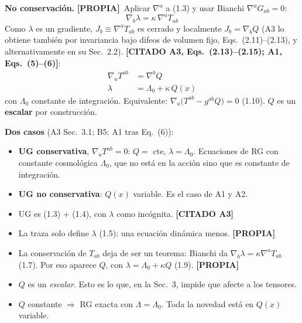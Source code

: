 \documentclass[11pt,a4paper]{article}
\newcommand{\propia}{{\bfseries\color{TealBlue}[PROPIA]}}
\newcommand{\citado}[1]{{\bfseries\color{RoyalBlue}[CITADO #1]}}
\newcommand{\sub}[2]{\par\medskip\noindent{\bfseries\color{NavyBlue}#1}\quad\textbf{#2}}
\begin{document}
\sub{1.5}{No conservación.} \propia\ Aplicar $\nabla^a$ a (1.3) y usar Bianchi $\nabla^aG_{ab}=0$:
\begin{equation}
\nabla_b\lambda=\kappa\,\nabla^aT_{ab}\tag{1.7}
\end{equation}
Como $\lambda$ es un gradiente, $J_b\equiv\nabla^aT_{ab}$ es cerrado y localmente $J_b=\nabla_bQ$ (A3 lo obtiene también por invariancia bajo difeos de volumen fijo, Eqs.~(2.11)--(2.13), y alternativamente en su Sec.~2.2). \citado{A3, Eqs.~(2.13)--(2.15); A1, Eqs.~(5)--(6)}:
\begin{align}
\nabla_aT^{ab}&=\nabla^bQ\tag{1.8}\\
\lambda&=\Lambda_0+\kappa\,Q(x)\tag{1.9}
\end{align}
con $\Lambda_0$ constante de integración. Equivalente: $\nabla_a\big(T^{ab}-g^{ab}Q\big)=0$ (1.10). $Q$ es un \textbf{escalar} por construcción.

\smallskip\noindent\textbf{Dos casos} (A3 Sec.~3.1; B5; A1 tras Eq.~(6)):
\begin{itemize}[nosep]
\item \textbf{UG conservativa}, $\nabla_aT^{ab}=0$: $Q=$ cte, $\lambda=\Lambda_0$. Ecuaciones de RG con constante cosmológica $\Lambda_0$, que no está en la acción sino que es constante de integración.
\item \textbf{UG no conservativa}: $Q(x)$ variable. Es el caso de A1 y A2.
\end{itemize}

\begin{llevarse}
\begin{itemize}[nosep]
\item UG es (1.3) + (1.4), con $\lambda$ como incógnita. \citado{A3}
\item La traza solo define $\lambda$ (1.5): una ecuación dinámica menos. \propia
\item La conservación de $T_{ab}$ deja de ser un teorema: Bianchi da $\nabla_b\lambda=\kappa\nabla^aT_{ab}$ (1.7). Por eso aparece $Q$, con $\lambda=\Lambda_0+\kappa Q$ (1.9). \propia
\item $Q$ es un \emph{escalar}. Esto es lo que, en la Sec.~3, impide que afecte a los tensores.
\item $Q$ constante $\Rightarrow$ RG exacta con $\Lambda=\Lambda_0$. Toda la novedad está en $Q(x)$ variable.
\end{itemize}
\end{llevarse}

\end{document}
